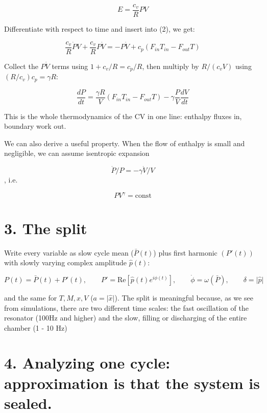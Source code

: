 \documentclass[11pt]{article}
\begin{document}
\[
E = \frac{c_v}{R}PV
\]

 Differentiate with respect to time and insert into (2), we get:

\[
\frac{c_v}{R}\dot PV + \frac{c_v}{R}P\dot V = -P\dot V + c_p(F_{in}T_{in} - F_{out}T)
\]

Collect the $P\dot V$ terms using $1 + c_v/R = c_p/R$, then multiply by $R/(c_vV)$ using $(R/c_v)c_p = \gamma R$:

\begin{equation}
\frac{dP}{dt} = \frac{\gamma R}{V}\left(F_{in}T_{in} - F_{out}T\right) - \gamma\frac{P}{V}\frac{dV}{dt} \tag{7}
\end{equation}

This is the whole thermodynamics of the CV in one line: enthalpy fluxes in, boundary work out. 

We can also derive a useful property. When the flow of enthalpy is small and negligible, we can assume isentropic expansion

 
\begin{equation}
\dot P/P = -\gamma\dot V/V \tag{8}
\end{equation}
, i.e. 

\[
PV^{\gamma} = \mathrm{const}
\]

\section*{3. The split}

Write every variable as slow cycle mean ($\bar P(t)$) plus first harmonic $(P'(t))$ with slowly varying complex amplitude $\hat p(t)$: 

\begin{equation}
P(t) = \bar P(t) + P'(t), \qquad P' = \mathrm{Re}\left[\hat p(t)e^{i\phi(t)}\right], \qquad \dot\phi = \omega(\bar P), \qquad \delta = \lvert\hat p\rvert \tag{9}
\end{equation}

and the same for $T, M, x, V$ ($a = \lvert\hat x\rvert$). The split is meaningful because, as we see from simulations, there are two different time scales: the fast oscillation of the resonator (100Hz and higher) and the slow, filling or discharging of the entire chamber (1 - 10 Hz)

\section*{4. Analyzing one cycle: approximation is that the system is sealed.}
\end{document}
